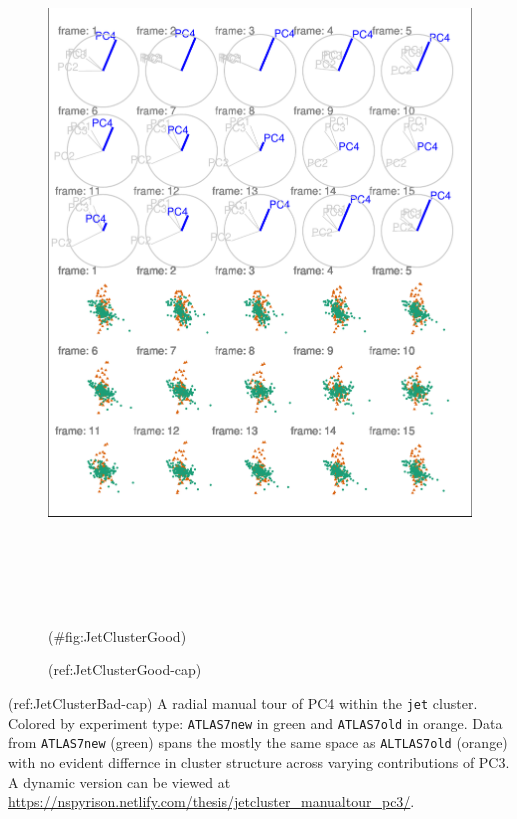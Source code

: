 \begin{Schunk}
\begin{figure}

{\centering \includegraphics[width=6in,height=7.2in]{spinifex_paper_files/figure-latex/JetClusterGood-1} 

}

\caption[(ref:JetClusterGood-cap)]{(ref:JetClusterGood-cap)}(\#fig:JetClusterGood)
\end{figure}
\end{Schunk}

(ref:JetClusterBad-cap) A radial manual tour of PC4 within the \texttt{jet} cluster. Colored by experiment type: \texttt{ATLAS7new} in green and \texttt{ATLAS7old} in orange. Data from \texttt{ATLAS7new} (green) spans the mostly the same space as \texttt{ALTLAS7old} (orange) with no evident differnce in cluster structure across varying contributions of PC3. A dynamic version can be viewed at \url{https://nspyrison.netlify.com/thesis/jetcluster_manualtour_pc3/}.

